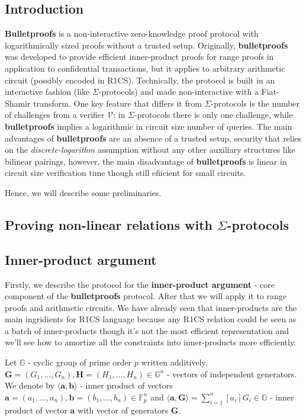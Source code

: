 \documentclass[../lecture-notes-148x210.tex]{subfiles}
\begin{document}
\subsection{Introduction}

\textbf{Bulletproofs} is a non-interactive zero-knowledge proof protocol with logarithmically sized proofs without a trusted setup. Originally, \textbf{bulletproofs} was developed to provide efficient inner-product proofs for range proofs in application to confidential transactions, but it applies to arbitrary arithmetic circuit (possibly encoded in R1CS). Technically, the protocol is built in an interactive fashion (like $\Sigma$-protocols) and made non-interactive with a Fiat-Shamir transform. One key feature that differs it from $\Sigma$-protocols is the number of challenges from a verifier $\mathcal{V}$: in $\Sigma$-protocols there is only one challenge, while \textbf{bulletproofs} implies a logarithmic in circuit size number of queries. The main advantages of \textbf{bulletproofs} are an absence of a trusted setup, security that relies on the \textit{discrete-logarithm} assumption without any other auxiliary structures like bilinear pairings, however, the main disadvantage of \textbf{bulletproofs} is linear in circuit size verification time though still efiicient for small circuits.

Hence, we will describe some preliminaries.

\subsection{Proving non-linear relations with $\Sigma$-protocols}

\subsection{Inner-product argument}

Firstly, we describe the protocol for the \textbf{inner-product argument} - core component of the \textbf{bulletproofs} protocol. After that we will apply it to range proofs and arithmetic circuits. We have already seen that inner-products are the main ingridients for R1CS language because any R1CS relation could be seen as a batch of inner-products though it's not the most efficient representation and we'll see how to amortize all the constraints into inner-products more efficiently.

Let $\mathbb{G}$ - cyclic group of prime order $p$ written additively, $\mathbf{G} = (G_1, \dots, G_n), \mathbf{H} = (H_1, \dots, H_n) \in \mathbb{G}^n$ - vectors of independent generators. We denote by $\langle \mathbf{a,b} \rangle$ - inner product of vectors $\mathbf{a} = (a_1, \dots, a_n), \mathbf{b} = (b_1, \dots, b_n) \in \mathbb{F}_p^n$ and $\langle \mathbf{a,G} \rangle = \sum_{i=1}^n [a_i] G_i \in \mathbb{G}$ - inner product of vector $\mathbf{a}$ with vector of generators $\mathbf{G}$.
\end{document}
